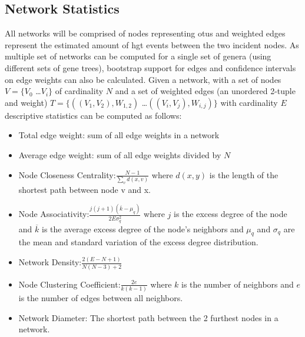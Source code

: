 \subsection{Network Statistics}
All networks will be comprised of nodes representing \ac{otu}s and weighted edges represent the estimated amount of \ac{hgt} events between the two incident nodes.
As multiple set of networks can be computed for a single set of genera (using different sets of gene trees), bootstrap support for edges and confidence intervals on edge weights can also be calculated.
Given a network, with a set of nodes $V = \{V_0$ \dots $V_i\}$ of cardinality $N$ and a set of weighted edges (an unordered 2-tuple and weight) $T = \{((V_1,V_2),W_{1,2})$ \dots $((V_i,V_j),W_{i,j})\}$ with cardinality $E$ descriptive statistics can be computed as follows\citep{netstat}:
\begin{itemize}
    \item Total edge weight: sum of all edge weights in a network
    \item Average edge weight: sum of all edge weights divided by $N$
    \item Node Closeness Centrality:$ \frac{N-1}{\sum_v d(x,v)}$ where $d(x,y)$ is the length of the shortest path between node v and x.
    \item Node Associativity:$ \frac{j(j+1)(\overline{k}-\mu_q)}{2E\sigma^2_q}$ where $j$ is the excess degree of the node and $\overline{k}$ is the average excess degree of the node's neighbors and $\mu_q$ and $\sigma_q$ are the mean and standard variation of the excess degree distribution.
    \item Network Density:$ \frac{2(E-N+1)}{N(N-3)+2}$
    \item Node Clustering Coefficient:$ \frac{2e}{k(k-1)}$ where $k$ is the number of neighbors and $e$ is the number of edges between all neighbors.
    \item Network Diameter: The shortest path between the 2 furthest nodes in a network.
\end{itemize}
\printbibliography


